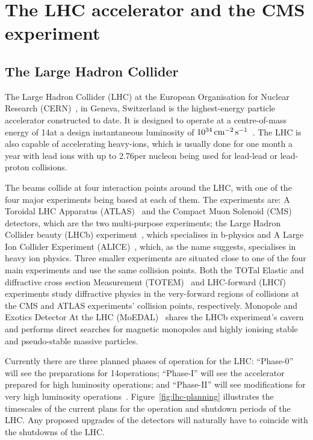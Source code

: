 \chapter{The LHC accelerator and the CMS experiment}\label{chapter:lhc-cms}
\section{The Large Hadron Collider}\label{sec:lhc}

The Large Hadron Collider (LHC) at the European Organisation for Nuclear Research (CERN)~\cite{Bruning:782076}, in Geneva, Switzerland is the highest-energy particle accelerator constructed to date. 
It is designed to operate at a centre-of-mass energy of 14\TeV at a design instantaneous luminosity of $10^{34}\,\text{cm}^\text{$-$2}\,\text{s}^\text{$-$1}$~\cite{Bayatian:2006zz}. 
The LHC is also capable of accelerating heavy-ions, which is usually done for one month a year with lead ions with up to 2.76\TeV per nucleon being used for lead-lead or lead-proton collisions.

The beams collide at four interaction points around the LHC, with one of the four major experiments being based at each of them. 
The experiments are: A Toroidal LHC Apparatus (ATLAS)~\cite{Aad:2008zzm} and the Compact Muon Solenoid (CMS)~\cite{oldcms} detectors, which are the two multi-purpose experiments; the Large Hadron Collider beauty (LHCb) experiment~\cite{Alves:2008zz}, which specialises in b-physics and A Large Ion Collider Experiment (ALICE)~\cite{Aamodt:2008zz}, which, as the name suggests, specialises in heavy ion physics.
Three smaller experiments are situated close to one of the four main experiments and use the same collision points.
Both the TOTal Elastic and diffractive cross section Measurement (TOTEM)~\cite{Anelli:2008zza} and LHC-forward (LHCf)~\cite{Adriani:2008zz} experiments study diffractive physics in the very-forward regions of collisions at the CMS and ATLAS experiments' collision points, respectively.
Monopole and Exotics Detector At the LHC (MoEDAL)~\cite{Pinfold:2009oia} shares the LHCb experiment's cavern and performs direct searches for magnetic monopoles and highly ionising stable and pseudo-stable massive particles.

Currently there are three planned phases of operation for the LHC: ``Phase-0'' will see the preparations for 14\TeV operations; ``Phase-I'' will see the accelerator prepared for high luminosity operations; and ``Phase-II'' will see modifications for very high luminosity operations~\cite{ECFA}. 
Figure~\ref{fig:lhc-planning} illustrates the timescales of the current plans for the operation and shutdown periods of the LHC.
Any proposed upgrades of the detectors will naturally have to coincide with the shutdowns of the LHC.

